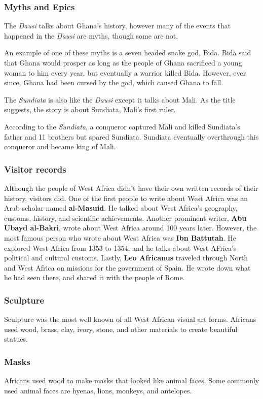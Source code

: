 \documentclass{article}
\begin{document}
\subsubsection{Myths and Epics}
The \textit{Dausi} talks about Ghana's history, however many of the events that happened in the \textit{Dausi} are myths, though some are not. 
\begin{example}[Dausi]An example of one of these myths is a seven headed snake god, Bida. Bida said that Ghana would prosper as long as the people of Ghana sacrificed a young woman to him every year, but eventually a warrior killed Bida. However, ever since, Ghana had been cursed by the god, which caused Ghana to fall. \end{example}
The \textit{Sundiata} is also like the \textit{Dausi} except it talks about Mali. As the title suggests, the story is about Sundiata, Mali's first ruler. 
\begin{example}[Sundiata]According to the \textit{Sundiata}, a conqueror captured Mali and killed Sundiata's father and 11 brothers but spared Sundiata. Sundiata eventually overthrough this conqueror and became king of Mali.\end{example}
\subsubsection{Visitor records}
Although the people of West Africa didn't have their own written records of their history, visitors did. One of the first people to write about West Africa was an Arab scholar named \textbf{al-Masuid}. He talked about West Africa's geography, customs, history, and scientific achievements. Another prominent writer, \textbf{Abu Ubayd al-Bakri}, wrote about West Africa around 100 years later. However, the most famous person who wrote about West Africa was \textbf{Ibn Battutah}. He explored West Africa from 1353 to 1354, and he talks about West AFrica's political and cultural customs. Lastly, \textbf{Leo Africanus} traveled through North and West Africa on missions for the government of Spain. He wrote down what he had seen there, and shared it with the people of Rome.
\subsubsection{Sculpture}
Sculpture was the most well known of all West African visual art forms. Africans used wood, brass, clay, ivory, stone, and other materials to create beautiful statues.
\subsubsection{Masks}
Africans used wood to make masks that looked like animal faces. Some commonly used animal faces are hyenas, lions, monkeys, and antelopes.
\end{document}

